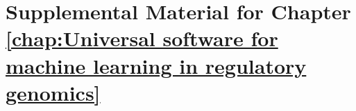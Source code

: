 \appendix{}

\chapter{Supplemental Material for Chapter \ref{chap:Universal software for machine learning in regulatory genomics}}

